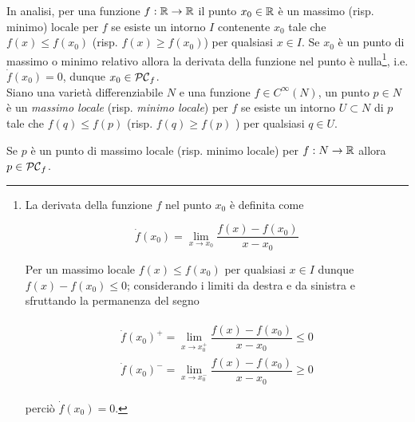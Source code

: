 In analisi, per una funzione $ f : \mathbb{R} \to \mathbb{R} $ il punto $ x_{0} \in \mathbb{R} $ è un massimo (risp. minimo) locale per $ f $ se esiste un intorno $ I $ contenente $ x_{0} $ tale che $ f(x) \leqslant f(x_{0}) $ (risp. $ f(x) \geqslant f(x_{0}) $) per qualsiasi $ x \in I $. Se $ x_{0} $ è un punto di massimo o minimo relativo allora la derivata della funzione nel punto è nulla\footnote{%
	La derivata della funzione $ f $ nel punto $ x_{0} $ è definita come
	
	\begin{equation*}
		\dot{f}(x_{0}) = \lim_{x \to x_{0}} \dfrac{f(x) - f(x_{0})}{x - x_{0}}
	\end{equation*}

	Per un massimo locale $ f(x) \leqslant f(x_{0}) $ per qualsiasi $ x \in I $ dunque $ f(x) - f(x_{0}) \leqslant 0 $; considerando i limiti da destra e da sinistra e sfruttando la permanenza del segno
	
	\begin{align*}
		\begin{split}
			\dot{f}(x_{0})^{+} = \lim_{x \to x_{0}^{+}} \dfrac{f(x) - f(x_{0})}{x - x_{0}} \leqslant 0 \\
			\dot{f}(x_{0})^{-} = \lim_{x \to x_{0}^{-}} \dfrac{f(x) - f(x_{0})}{x - x_{0}} \geqslant 0
		\end{split}
	\end{align*}

	perciò $ \dot{f}(x_{0}) = 0 $.%
}, i.e. $ \dot{f}(x_{0}) = 0 $, dunque $ x_{0} \in \mathcal{PC}_{f} $. \\
Siano una varietà differenziabile $ N $ e una funzione $ f \in C^{\infty}(N) $, un punto $ p \in N $ è un \textit{massimo locale} (risp. \textit{minimo locale}) per $ f $ se esiste un intorno $ U \subset N $ di $ p $ tale che $ f(q) \leqslant f(p) $ (risp. $ f(q) \geqslant f(p) $ ) per qualsiasi $ q \in U $.

\begin{definition}
	Se $ p $ è un punto di massimo locale (risp. minimo locale) per $ f : N \to \mathbb{R} $ allora $ p \in \mathcal{PC}_{f} $.
\end{definition}

